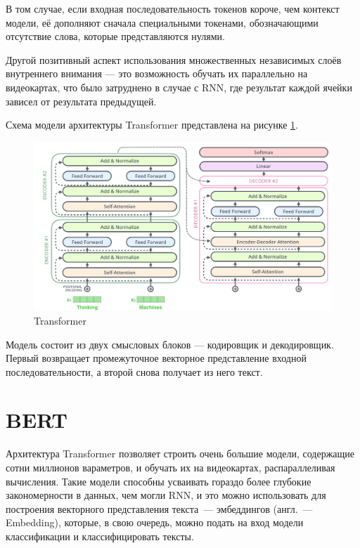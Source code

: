 В том случае, если входная последовательность токенов короче, чем контекст модели, её дополняют сначала специальными токенами, обозначающими отсутствие слова, которые представляются нулями.

Другой позитивный аспект использования множественных независимых слоёв внутреннего внимания --- это возможность обучать их параллельно на видеокартах, что было затруднено в случае с RNN, где результат каждой ячейки зависел от результата предыдущей.

Схема модели архитектуры Transformer представлена на рисунке \ref*{fig:transformer}.

\begin{figure}[h]
    \centering
    \includegraphics[width=\textwidth]{../inc/images/transformer.png}
    \caption{Transformer}
    \label{fig:transformer}
\end{figure}

Модель состоит из двух смысловых блоков --- кодировщик и декодировщик. Первый возвращает промежуточное векторное представление входной последовательности, а второй снова получает из него текст.

\section{BERT}

Архитектура Transformer позволяет строить очень большие модели, содержащие сотни миллионов вараметров, и обучать их на видеокартах, распараллеливая вычисления. Такие модели способны усваивать гораздо более глубокие закономерности в данных, чем могли RNN, и это можно использовать для построения векторного представления текста --- эмбеддингов (англ. --- Embedding), которые, в свою очередь, можно подать на вход модели классификации и классифицировать тексты.

